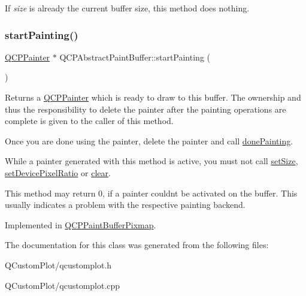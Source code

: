 If {\itshape size} is already the current buffer size, this method does nothing. \mbox{\label{class_q_c_p_abstract_paint_buffer_a9e9f29b19c033cf02fb96f1a148463f3}} 
\subsubsection{\texorpdfstring{start\+Painting()}{startPainting()}}
{\footnotesize\ttfamily \mbox{\hyperlink{class_q_c_p_painter}{Q\+C\+P\+Painter}} $\ast$ Q\+C\+P\+Abstract\+Paint\+Buffer\+::start\+Painting (\begin{DoxyParamCaption}{ }\end{DoxyParamCaption})\hspace{0.3cm}{\ttfamily [pure virtual]}}

Returns a \mbox{\hyperlink{class_q_c_p_painter}{Q\+C\+P\+Painter}} which is ready to draw to this buffer. The ownership and thus the responsibility to delete the painter after the painting operations are complete is given to the caller of this method.

Once you are done using the painter, delete the painter and call \mbox{\hyperlink{class_q_c_p_abstract_paint_buffer_a41b0dc6e7744f19fae09f8532c207dc1}{done\+Painting}}.

While a painter generated with this method is active, you must not call \mbox{\hyperlink{class_q_c_p_abstract_paint_buffer_a8b68c3cd36533f1a4a23b5ce8cd66f01}{set\+Size}}, \mbox{\hyperlink{class_q_c_p_abstract_paint_buffer_a555eaad5d5c806420ff35602a1bb68fa}{set\+Device\+Pixel\+Ratio}} or \mbox{\hyperlink{class_q_c_p_abstract_paint_buffer_a9e253f4541dfc01992b77e8830bd7722}{clear}}.

This method may return 0, if a painter couldn\textquotesingle{}t be activated on the buffer. This usually indicates a problem with the respective painting backend. 

Implemented in \mbox{\hyperlink{class_q_c_p_paint_buffer_pixmap_a357964ef7d28cfa530338be4e5c93234}{Q\+C\+P\+Paint\+Buffer\+Pixmap}}.



The documentation for this class was generated from the following files\+:\begin{DoxyCompactItemize}
\item 
Q\+Custom\+Plot/qcustomplot.\+h\item 
Q\+Custom\+Plot/qcustomplot.\+cpp\end{DoxyCompactItemize}
